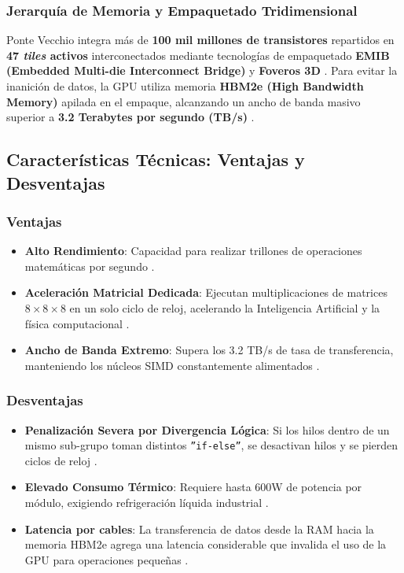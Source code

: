 \documentclass[12pt,a4paper]{article}
\begin{document}
\subsubsection{Jerarquía de Memoria y Empaquetado Tridimensional}
Ponte Vecchio integra más de \textbf{100 mil millones de transistores} repartidos en \textbf{47 \textit{tiles} activos} interconectados mediante tecnologías de empaquetado \textbf{EMIB (Embedded Multi-die Interconnect Bridge)} y \textbf{Foveros 3D} \cite{intel_pontevecchio}. Para evitar la inanición de datos, la GPU utiliza memoria \textbf{HBM2e (High Bandwidth Memory)} apilada en el empaque, alcanzando un ancho de banda masivo superior a \textbf{3.2 Terabytes por segundo (TB/s)} \cite{intel_pontevecchio}.

\subsection{Características Técnicas: Ventajas y Desventajas}

\subsubsection{Ventajas}
\begin{itemize}[leftmargin=*]
    \item \textbf{Alto Rendimiento}: Capacidad para realizar trillones de operaciones matemáticas por segundo \cite{intel_pontevecchio}.
    \item \textbf{Aceleración Matricial Dedicada}: Ejecutan multiplicaciones de matrices $8 \times 8 \times 8$ en un solo ciclo de reloj, acelerando la Inteligencia Artificial y la física computacional \cite{intel_pontevecchio}.
    \item \textbf{Ancho de Banda Extremo}: Supera los 3.2 TB/s de tasa de transferencia, manteniendo los núcleos SIMD constantemente alimentados \cite{intel_pontevecchio}.
\end{itemize}

\subsubsection{Desventajas}
\begin{itemize}[leftmargin=*]
    \item \textbf{Penalización Severa por Divergencia Lógica}: Si los hilos dentro de un mismo sub-grupo  toman distintos \texttt{''if-else''},  se desactivan hilos y se pierden ciclos de reloj \cite{intel_pontevecchio}.
    \item \textbf{Elevado Consumo Térmico}: Requiere hasta 600W de potencia por módulo, exigiendo refrigeración líquida industrial \cite{intel_pontevecchio}.
    \item \textbf{Latencia por cables}: La transferencia de datos desde la RAM hacia la memoria HBM2e agrega una latencia considerable que invalida el uso de la GPU para operaciones pequeñas \cite{intel_pontevecchio}.
\end{itemize}
\end{document}
